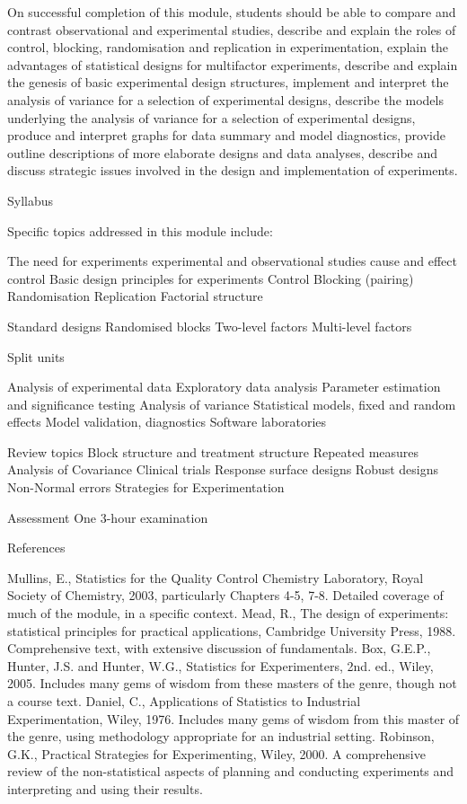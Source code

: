 On successful completion of this module, students should be able to
 compare and contrast observational and experimental studies,
describe and explain the roles of control, blocking, randomisation and replication in experimentation,
explain the advantages of statistical designs for multifactor experiments,
describe and explain the genesis of basic experimental design structures,
implement  and interpret the analysis of variance for a selection of experimental designs,
describe the models underlying the analysis of variance for a selection of experimental designs,
produce and interpret graphs for data summary and model diagnostics,
provide outline descriptions of more elaborate designs and data analyses,
describe and discuss strategic issues involved in the design and implementation of experiments.
 
Syllabus
 
Specific topics addressed in this module include:
 
The need for experiments 
experimental and observational studies
 cause and effect
 control
Basic design principles for experiments
 Control
 Blocking (pairing)
 Randomisation
 Replication
 Factorial structure
 
Standard designs
 Randomised blocks
 Two-level factors
 Multi-level factors
 
Split units
 
Analysis of experimental data
 Exploratory data analysis
 Parameter estimation and significance testing
 Analysis of variance
 Statistical models, fixed and random effects
 Model validation, diagnostics
 Software laboratories
 
Review topics
 Block structure and treatment structure
 Repeated measures 
Analysis of Covariance
 Clinical trials
 Response surface designs
 Robust designs
 Non-Normal errors
 Strategies for Experimentation
 
Assessment One 3-hour examination
 
References
 
Mullins, E., Statistics for the Quality Control Chemistry Laboratory, Royal Society of Chemistry, 2003, particularly Chapters 4-5, 7-8.  Detailed coverage of much of the module, in a specific context.
Mead, R., The design of experiments: statistical principles for practical applications, Cambridge University Press, 1988. Comprehensive text, with extensive discussion of fundamentals.
Box, G.E.P., Hunter, J.S. and Hunter, W.G., Statistics for Experimenters, 2nd. ed., Wiley, 2005.  Includes many gems of wisdom from these masters of the genre, though not a course text.
 Daniel, C., Applications of Statistics to Industrial Experimentation, Wiley, 1976.  Includes many gems of wisdom from this master of the genre, using methodology appropriate for an industrial setting.
 Robinson, G.K., Practical Strategies for Experimenting, Wiley, 2000.  A comprehensive review of the non-statistical aspects of planning and conducting experiments and interpreting and using their results.
  
